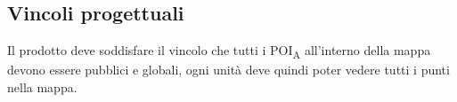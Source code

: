 \subsection{Vincoli progettuali}
Il prodotto deve soddisfare il vincolo che tutti i \acrshort{POI}\textsubscript{A} all'interno della mappa devono essere pubblici e globali, ogni unità deve quindi poter vedere tutti i punti nella mappa.